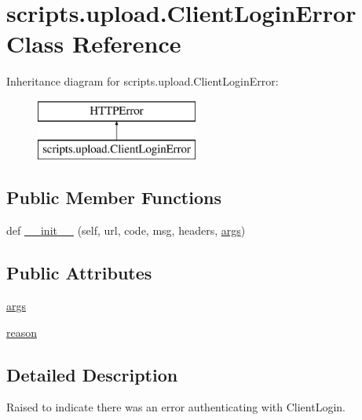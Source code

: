 \hypertarget{classscripts_1_1upload_1_1_client_login_error}{}\section{scripts.\+upload.\+Client\+Login\+Error Class Reference}
\label{classscripts_1_1upload_1_1_client_login_error}
Inheritance diagram for scripts.\+upload.\+Client\+Login\+Error\+:\begin{figure}[H]
\begin{center}
\leavevmode
\includegraphics[height=2.000000cm]{d7/d67/classscripts_1_1upload_1_1_client_login_error}
\end{center}
\end{figure}
\subsection*{Public Member Functions}
\begin{DoxyCompactItemize}
\item 
def \mbox{\hyperlink{classscripts_1_1upload_1_1_client_login_error_aa43915e2d5be5d4b7f4fac0b556547cd}{\+\_\+\+\_\+init\+\_\+\+\_\+}} (self, url, code, msg, headers, \mbox{\hyperlink{classscripts_1_1upload_1_1_client_login_error_ac688365514574efde7d44b2c9ea5a1d2}{args}})
\end{DoxyCompactItemize}
\subsection*{Public Attributes}
\begin{DoxyCompactItemize}
\item 
\mbox{\hyperlink{classscripts_1_1upload_1_1_client_login_error_ac688365514574efde7d44b2c9ea5a1d2}{args}}
\item 
\mbox{\hyperlink{classscripts_1_1upload_1_1_client_login_error_a3501927dafb0e62c50edce2f55b70bac}{reason}}
\end{DoxyCompactItemize}


\subsection{Detailed Description}
\begin{DoxyVerb}Raised to indicate there was an error authenticating with ClientLogin.\end{DoxyVerb}
 


